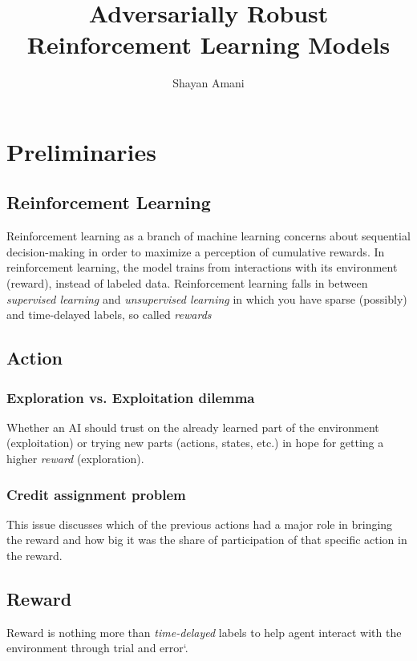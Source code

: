 \documentclass[a4paper,12pt]{article}
\title{Adversarially Robust Reinforcement Learning Models}
\author{Shayan Amani}
\begin{document}
\maketitle


\section{Preliminaries}

\subsection{Reinforcement Learning}
Reinforcement learning as a branch of machine learning concerns about sequential decision-making in order to maximize a perception of cumulative rewards. In reinforcement learning, the model trains from interactions with its environment (reward), instead of labeled data. Reinforcement learning falls in between \textit{supervised learning} and \textit{unsupervised learning} in which you have sparse (possibly) and time-delayed labels, so called \textit{rewards} 

\subsection{Action}

\subsubsection{Exploration vs. Exploitation dilemma}
Whether an AI should trust on the already learned part of the environment (exploitation) or trying new parts (actions, states, etc.) in hope for getting a higher \textit{reward} (exploration). 

\subsubsection{Credit assignment problem}
This issue discusses which of the previous actions had a major role in bringing the reward and how big it was the share of participation of that specific action in the reward.

\subsection{Reward}
Reward is nothing more than \textit{time-delayed} labels to help agent interact with the environment through trial and error`. 
\end{document}
